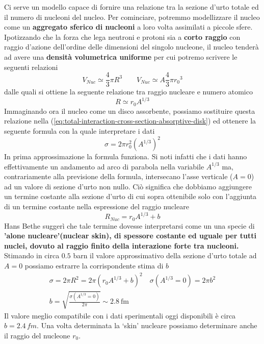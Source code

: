 Ci serve un modello capace di fornire una relazione tra la sezione d'urto totale ed il numero di nucleoni del nucleo.
Per cominciare, potremmo modellizzare il nucleo come un \textbf{aggregato sferico di nucleoni} a loro volta assimilati a piccole sfere.
Ipotizzando che la forza che lega neutroni e protoni sia a \textbf{corto raggio} con raggio d'azione dell'ordine delle dimensioni del singolo nucleone, il nucleo tenderà ad avere una \textbf{densità volumetrica uniforme} per cui potremo scrivere le seguenti relazioni \[
	V_{Nuc} \simeq \frac{4}{3} \pi R^3 \qquad V_{Nuc} \simeq A\frac{4}{3} \pi {r_{0}}^3
\] dalle quali si ottiene la seguente relazione tra raggio nucleare e numero atomico
\[
	R \simeq r_{0} A^{1/3}
\]
Immaginando ora il nucleo come un disco assorbente, possiamo sostituire questa relazione nella (\ref{eq:total-interaction-cross-section-absorptive-disk}) ed ottenere la seguente formula con la quale interpretare i dati \[
	\sigma = 2 \pi r_{0}^{2}(A^{1/3})^{2}
\]
In prima approssimazione la formula funziona.
Si noti infatti che i dati hanno effettivamente un andamento ad arco di parabola nella variabile $A^{1/3}$ ma, contrariamente alla previsione della formula, intersecano l'asse verticale ($A=0$) ad un valore di sezione d'urto non nullo.
Ciò significa che dobbiamo aggiungere un termine costante alla sezione d'urto di cui sopra ottenibile solo con l'aggiunta di un termine costante nella espressione del raggio nucleare
\begin{equation}
	R_{Nuc} = r_{0} A^{1/3} + b
	\label{eq:nuclear-radius-skin}
\end{equation}
Hans Bethe suggerì che tale termine dovesse interpretarsi come un una specie di \textbf{'alone nucleare'(nuclear skin), di spessore costante ed uguale per tutti nuclei, dovuto al raggio finito della interazione forte tra nucleoni.} Stimando in circa $0.5$ barn
il valore approssimativo della sezione d'urto totale ad $A=0$ possiamo estrarre la corrispondente stima di $b$
\begin{gather*}
    \sigma = 2 \pi R^{2} = 2 \pi (r_{0} A^{1/3} +b)^{2} \quad \sigma(A^{1/3}=0) = 2\pi b^{2}\\
    b = \sqrt{ \frac{\sigma(A^{1/3}=0)}{2 \pi} }\sim 2.8 \ \text{fm}
\end{gather*}
Il valore meglio compatibile con i dati sperimentali oggi disponibili è circa $b=2.4 \, fm$.
Una volta determinata la `skin' nucleare possiamo determinare anche il raggio del nucleone $r_0$.


